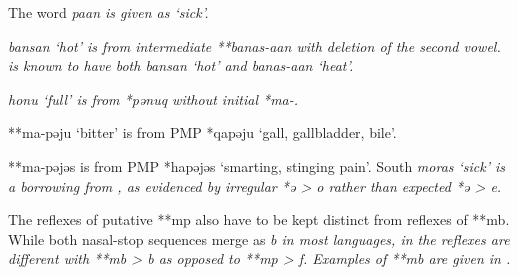 \begin{table}[p]
\begin{threeparttable}
\begin{tablenotes}
{								The word \it{paan} is given as ‘sick’.}
			\item[‡]	{ \it{bansan} ‘hot’ is from intermediate **banas-aan with
								deletion of the second vowel.
								  is known to have both \it{bansan} ‘hot’ and \it{banas-aan} ‘heat’.}
			\item[Δ]	{ \it{honu} ‘full’ is from *pənuq without initial *ma-.}
			\item[{ǁ}]	{**ma-pəju ‘bitter’ is from PMP *qapəju ‘gall, gallbladder, bile’.}
			\item[¶]	{**ma-pəjəs is from PMP *hapəjəs ‘smarting, stinging pain’.
								South  \it{moras} ‘sick’ is a borrowing from ,
								as evidenced by irregular *ə > \it{o} rather than expected *ə > \it{e}.}
		\end{tablenotes}
	\end{threeparttable}
\end{table}

The reflexes of putative **mp also have to be kept distinct from reflexes of **mb.
While both nasal-stop sequences merge as \it{b} in most  languages, in  the reflexes are different with **mb > \it{b} as opposed
to **mp > \it{f.} Examples of **mb are given in .

